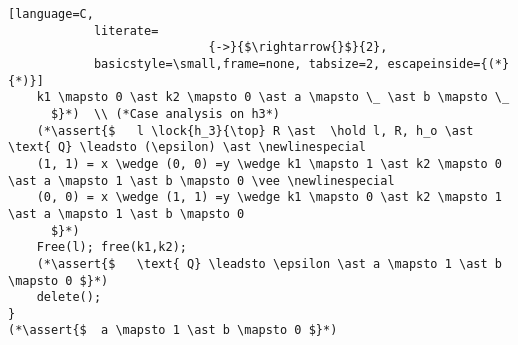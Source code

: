 \documentclass[8pt]{article}
\newcommand{\lock}[2]{ \square \hspace{-1ex} \xrightarrow[#1]{#2}}
\newcommand{\hold}{\text{Hold }}
\newcommand{\assert}[1]{\textcolor{blue}{ \{ #1 \}  } }
\newcommand{\newlinespecial}{\newline \hphantom{100pt}}
\begin{document}
\begin{lstlisting}[language=C,
			literate=
               				{->}{$\rightarrow{}$}{2},
			basicstyle=\small,frame=none, tabsize=2, escapeinside={(*}{*)}]
	k1 \mapsto 0 \ast k2 \mapsto 0 \ast a \mapsto \_ \ast b \mapsto \_
	  $}*)  \\ (*Case analysis on h3*)
	(*\assert{$   l \lock{h_3}{\top} R \ast  \hold l, R, h_o \ast  \text{ Q} \leadsto (\epsilon) \ast \newlinespecial
	(1, 1) = x \wedge (0, 0) =y \wedge k1 \mapsto 1 \ast k2 \mapsto 0 \ast a \mapsto 1 \ast b \mapsto 0 \vee \newlinespecial
	(0, 0) = x \wedge (1, 1) =y \wedge k1 \mapsto 0 \ast k2 \mapsto 1 \ast a \mapsto 1 \ast b \mapsto 0
	  $}*)
	Free(l); free(k1,k2);
	(*\assert{$   \text{ Q} \leadsto \epsilon \ast a \mapsto 1 \ast b \mapsto 0 $}*)
	delete();
}
(*\assert{$  a \mapsto 1 \ast b \mapsto 0 $}*)
	
\end{lstlisting}







\newpage
\end{document}
